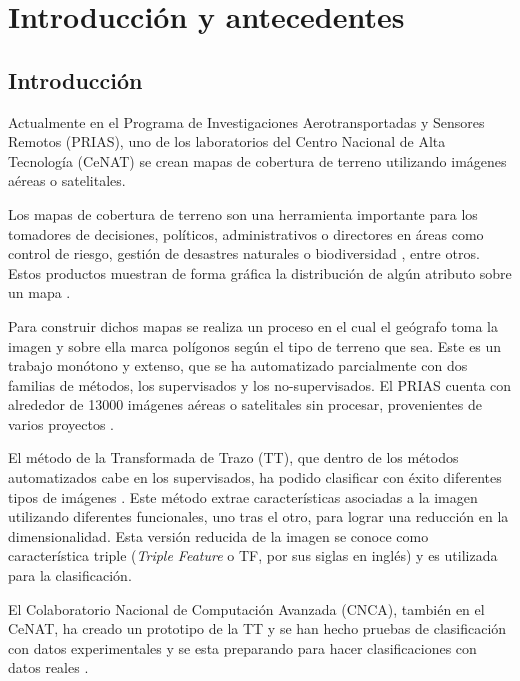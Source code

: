 \chapter{Introducción y antecedentes}



\section{Introducción}

Actualmente en el Programa de Investigaciones Aerotransportadas y Sensores Remotos (PRIAS), uno de los laboratorios del Centro Nacional de Alta Tecnología (CeNAT) se crean mapas de cobertura de terreno utilizando imágenes aéreas o satelitales\cite{Biomarcc2013}. 

Los mapas de cobertura de terreno son una herramienta importante para los tomadores de decisiones, políticos, administrativos o directores en áreas como control de riesgo, gestión de desastres naturales o biodiversidad \cite{Biomarcc2013}, entre otros. Estos productos muestran de forma gráfica la distribución de algún atributo sobre un mapa \cite{Maps2014}.

Para construir dichos mapas se realiza un proceso en el cual el geógrafo toma la imagen y sobre ella marca polígonos según el tipo de terreno que sea. Este es un trabajo monótono y extenso, que se ha automatizado parcialmente con dos familias de métodos, los supervisados y los no-supervisados\cite{Chuvieco2010}. El PRIAS cuenta con alrededor de 13000 imágenes aéreas o satelitales sin procesar, provenientes de varios proyectos \cite{CARTA} \cite{RapidEye2012}.

El método de la Transformada de Trazo (TT), que dentro de los métodos automatizados cabe en los supervisados, \cite{Kadyrov2001} ha podido clasificar con éxito diferentes tipos de imágenes \cite{Bok2008} \cite{Srisuky2003} \cite{Petrou2007}. Este método extrae características asociadas a la imagen utilizando diferentes funcionales, uno tras el otro, para lograr una reducción en la dimensionalidad. Esta versión reducida de la imagen se conoce como característica triple (\emph{Triple Feature} o TF, por sus siglas en inglés) y es utilizada para la clasificación.

El Colaboratorio Nacional de Computación Avanzada (CNCA), también en el CeNAT, ha creado un prototipo de la TT y se han hecho pruebas de clasificación con datos experimentales y se esta preparando para hacer clasificaciones con datos reales \cite{Garita2013}.

